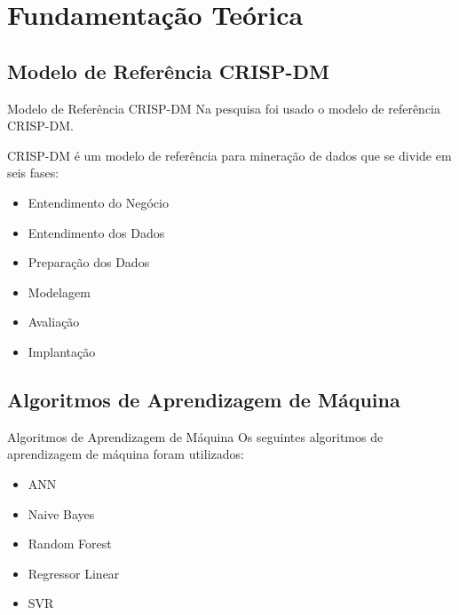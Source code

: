 \section{Fundamentação Teórica}
\subsection{Modelo de Referência CRISP-DM}
\begin{frame}{Modelo de Referência CRISP-DM}
    Na pesquisa foi usado o modelo de referência CRISP-DM. 
    
    \vspace{0.5cm}

    CRISP-DM é um modelo de referência para mineração de dados que se divide em seis
    fases: 
    \begin{itemize}
        \item Entendimento do Negócio
        \item Entendimento dos Dados
        \item Preparação dos Dados
        \item Modelagem
        \item Avaliação 
        \item Implantação
    \end{itemize}
\end{frame}

\subsection{Algoritmos de Aprendizagem de Máquina}
\begin{frame}{Algoritmos de Aprendizagem de Máquina}
    Os seguintes algoritmos de aprendizagem de máquina foram utilizados: 
    \begin{itemize}
        \item ANN
        \item Naive Bayes
        \item Random Forest
        \item Regressor Linear
        \item SVR
    \end{itemize}
\end{frame}

